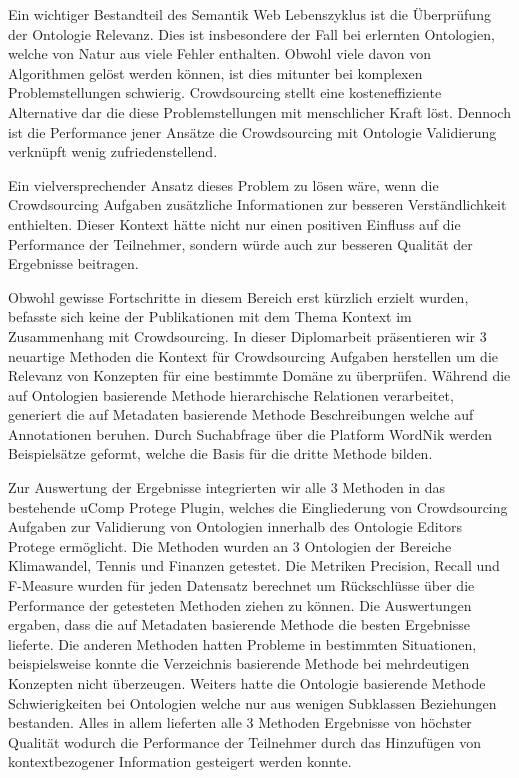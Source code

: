 \begin{kurzfassung}
	Ein wichtiger Bestandteil des Semantik Web Lebenszyklus ist die Überprüfung der Ontologie Relevanz. Dies ist insbesondere der Fall bei erlernten 
	Ontologien, welche von Natur aus viele Fehler enthalten. Obwohl viele davon von Algorithmen gelöst werden können, ist dies mitunter bei
	komplexen Problemstellungen schwierig. Crowdsourcing stellt eine kosteneffiziente Alternative dar die diese Problemstellungen mit menschlicher
	Kraft löst. Dennoch ist die Performance jener Ansätze die Crowdsourcing mit Ontologie Validierung verknüpft wenig zufriedenstellend. 
	
	Ein vielversprechender Ansatz dieses Problem zu lösen wäre, wenn die Crowdsourcing Aufgaben zusätzliche Informationen zur besseren
	Verständlichkeit enthielten. Dieser Kontext hätte nicht nur einen positiven Einfluss auf die Performance der Teilnehmer, sondern würde auch 
	zur besseren Qualität der Ergebnisse beitragen.
	
	Obwohl gewisse Fortschritte in diesem Bereich erst kürzlich erzielt wurden, befasste sich keine der Publikationen mit dem Thema Kontext
	im Zusammenhang mit Crowdsourcing. In dieser Diplomarbeit präsentieren wir 3 neuartige Methoden die Kontext für Crowdsourcing Aufgaben herstellen 
	um die Relevanz von Konzepten für eine bestimmte Domäne zu überprüfen. Während die auf Ontologien basierende Methode hierarchische Relationen
	verarbeitet, generiert die auf Metadaten basierende Methode Beschreibungen welche auf Annotationen beruhen. Durch Suchabfrage über die Platform
	WordNik	werden Beispielsätze geformt, welche die Basis für die dritte Methode bilden. 
	
	Zur Auswertung der Ergebnisse integrierten wir alle 3 Methoden in das bestehende uComp Protege Plugin, welches die Eingliederung von Crowdsourcing 
	Aufgaben zur Validierung von Ontologien innerhalb des Ontologie Editors Protege ermöglicht. Die Methoden wurden an 3 Ontologien der Bereiche
	Klimawandel, Tennis und Finanzen getestet. Die Metriken Precision, Recall und F-Measure wurden für jeden Datensatz berechnet um Rückschlüsse über 
	die Performance der getesteten Methoden ziehen zu können. Die Auswertungen ergaben, dass die auf Metadaten basierende Methode die besten
	Ergebnisse lieferte. Die anderen Methoden hatten Probleme in bestimmten Situationen, beispielsweise konnte die Verzeichnis basierende Methode 
	bei mehrdeutigen Konzepten nicht überzeugen. Weiters hatte die Ontologie basierende Methode Schwierigkeiten bei Ontologien welche nur aus wenigen
	Subklassen Beziehungen bestanden. Alles in allem lieferten alle 3 Methoden Ergebnisse von höchster Qualität wodurch die Performance der Teilnehmer
	durch das Hinzufügen von kontextbezogener Information gesteigert werden konnte. 
	
\end{kurzfassung}